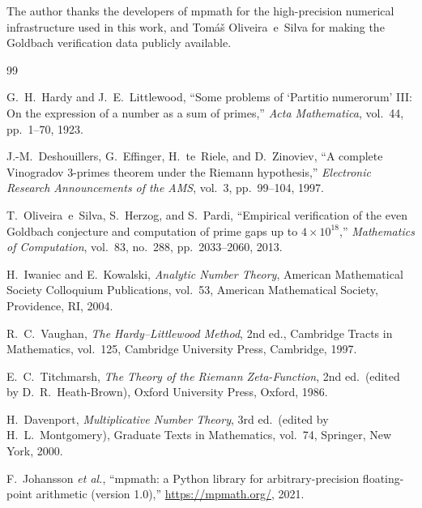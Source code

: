 \documentclass[11pt,a4paper]{article}
\theoremstyle{plain}
\theoremstyle{definition}
\theoremstyle{remark}
\numberwithin{equation}{section}
\numberwithin{table}{section}
\begin{document}
The author thanks the developers of mpmath \cite{mpmath} for the
high-precision numerical infrastructure used in this work, and Tom\'a\v{s}
Oliveira~e~Silva for making the Goldbach verification data publicly
available.

\begin{thebibliography}{99}

G.\ H.\ Hardy and J.\ E.\ Littlewood,
``Some problems of `Partitio numerorum' III: On the expression of a number
as a sum of primes,''
\emph{Acta Mathematica}, vol.\ 44, pp.\ 1--70, 1923.

J.-M.\ Deshouillers, G.\ Effinger, H.\ te~Riele, and D.\ Zinoviev,
``A complete Vinogradov $3$-primes theorem under the Riemann
hypothesis,''
\emph{Electronic Research Announcements of the AMS}, vol.\ 3,
pp.\ 99--104, 1997.

T.\ Oliveira~e~Silva, S.\ Herzog, and S.\ Pardi,
``Empirical verification of the even Goldbach conjecture and computation
of prime gaps up to $4\times 10^{18}$,''
\emph{Mathematics of Computation}, vol.\ 83, no.\ 288,
pp.\ 2033--2060, 2013.

H.\ Iwaniec and E.\ Kowalski,
\emph{Analytic Number Theory},
American Mathematical Society Colloquium Publications, vol.\ 53,
American Mathematical Society, Providence, RI, 2004.

R.\ C.\ Vaughan,
\emph{The Hardy--Littlewood Method},
2nd ed., Cambridge Tracts in Mathematics, vol.\ 125,
Cambridge University Press, Cambridge, 1997.

E.\ C.\ Titchmarsh,
\emph{The Theory of the Riemann Zeta-Function},
2nd ed.\ (edited by D.\ R.\ Heath-Brown),
Oxford University Press, Oxford, 1986.

H.\ Davenport,
\emph{Multiplicative Number Theory},
3rd ed.\ (edited by H.\ L.\ Montgomery),
Graduate Texts in Mathematics, vol.\ 74,
Springer, New York, 2000.

F.\ Johansson \emph{et al.},
``mpmath: a Python library for arbitrary-precision floating-point
arithmetic (version 1.0),''
\url{https://mpmath.org/}, 2021.

\end{thebibliography}
\end{document}
